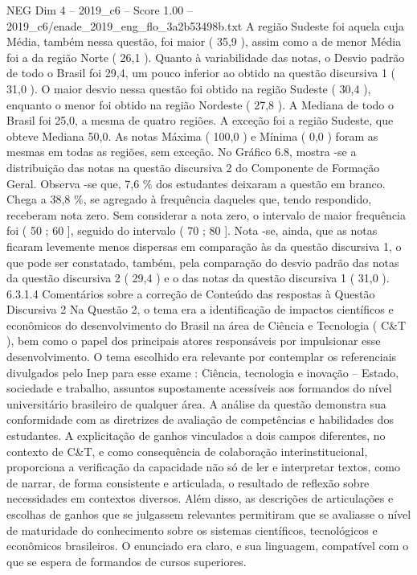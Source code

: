 \begin{textsample}{NEG Dim 4 – 2019\_c6 – Score 1.00 – 2019\_c6/enade\_2019\_eng\_flo\_3a2b53498b.txt}
A região Sudeste foi aquela cuja Média, também nessa questão, foi maior ( 35,9 ), assim como a de menor Média foi a da região Norte ( 26,1 ).
Quanto à variabilidade das notas, o Desvio padrão de todo o Brasil foi 29,4, um pouco inferior ao obtido na questão discursiva 1 ( 31,0 ).
O maior desvio nessa questão foi obtido na região Sudeste ( 30,4 ), enquanto o menor foi obtido na região Nordeste ( 27,8 ).
A Mediana de todo o Brasil foi 25,0, a mesma de quatro regiões.
A exceção foi a região Sudeste, que obteve Mediana 50,0.
As notas Máxima ( 100,0 ) e Mínima ( 0,0 ) foram as mesmas em todas as regiões, sem exceção.
No Gráfico 6.8, mostra -se a distribuição das notas na questão discursiva 2 do Componente de Formação Geral.
Observa -se que, 7,6 \% dos estudantes deixaram a questão em branco.
Chega a 38,8 \%, se agregado à frequência daqueles que, tendo respondido, receberam nota zero.
Sem considerar a nota zero, o intervalo de maior frequência foi ( 50 ; 60 ], seguido do intervalo ( 70 ; 80 ].
Nota -se, ainda, que as notas ficaram levemente menos dispersas em comparação às da questão discursiva 1, o que pode ser constatado, também, pela comparação do desvio padrão das notas da questão discursiva 2 ( 29,4 ) e o das notas da questão discursiva 1 ( 31,0 ). 6.3.1.4 Comentários sobre a correção de Conteúdo das respostas à Questão Discursiva 2 Na Questão 2, o tema era a identificação de impactos científicos e econômicos do desenvolvimento do Brasil na área de Ciência e Tecnologia ( C\&T ), bem como o papel dos principais atores responsáveis por impulsionar esse desenvolvimento.
O tema escolhido era relevante por contemplar os referenciais divulgados pelo Inep para esse exame : Ciência, tecnologia e inovação – Estado, sociedade e trabalho, assuntos supostamente acessíveis aos formandos do nível universitário brasileiro de qualquer área.
A análise da questão demonstra sua conformidade com as diretrizes de avaliação de competências e habilidades dos estudantes.
A explicitação de ganhos vinculados a dois campos diferentes, no contexto de C\&T, e como consequência de colaboração interinstitucional, proporciona a verificação da capacidade não só de ler e interpretar textos, como de narrar, de forma consistente e articulada, o resultado de reflexão sobre necessidades em contextos diversos.
Além disso, as descrições de articulações e escolhas de ganhos que se julgassem relevantes permitiram que se avaliasse o nível de maturidade do conhecimento sobre os sistemas científicos, tecnológicos e econômicos brasileiros.
O enunciado era claro, e sua linguagem, compatível com o que se espera de formandos de cursos superiores.

\end{textsample}
